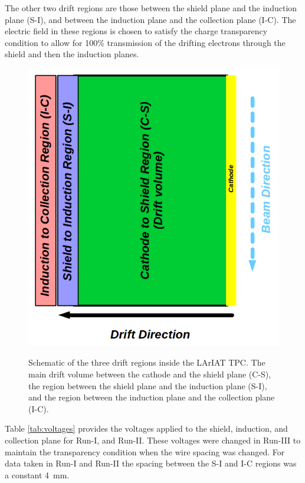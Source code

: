 The other two drift regions are those between the shield plane and the induction plane (S-I), and between the induction plane and the collection plane (I-C). The electric field in these regions is chosen to satisfy the charge transparency condition to allow for 100$\%$ transmission of the drifting electrons through the shield and then the induction planes.

\begin{figure}[htb]
\centering
\includegraphics[scale=0.35]{./images/DriftRegions.png}\\
\caption{Schematic of the three drift regions inside the LArIAT TPC. The main drift volume between the cathode and the shield plane (C-S), the region between the shield plane and the induction plane (S-I), and the region between the induction plane and the collection plane (I-C).}
\label{fig:driftregions}
\end{figure}

Table \ref{tab:voltages} provides the voltages applied to the shield, induction, and collection plane for Run-I, and Run-II. These voltages were changed in Run-III to maintain the transparency condition when the wire spacing was changed. For data taken in Run-I and Run-II the spacing between the S-I and I-C regions was a constant 4~mm.

